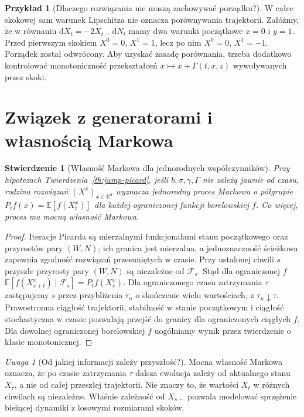 \documentclass[11pt,a4paper,oneside]{report}
\numberwithin{equation}{chapter}
\theoremstyle{plain}
\newtheorem{stwierdzenie}[twierdzenie]{Stwierdzenie}
\theoremstyle{definition}
\newtheorem{przyklad}{Przykład}[chapter]
\theoremstyle{remark}
\newtheorem{uwaga}{Uwaga}[chapter]
\newcommand{\R}{\mathbb{R}}
\newcommand{\E}{\mathbb{E}}
\newcommand{\calF}{\mathcal{F}}
\newcommand{\dd}{\mathrm{d}}
\begin{document}
\begin{przyklad}[Dlaczego rozwiązania nie muszą zachowywać porządku?]
W całce skokowej sam warunek Lipschitza nie oznacza
porównywania trajektorii. Załóżmy, że w równaniu
$\dd X_t=-2X_{t-}\,\dd N_t$ mamy dwa warunki
początkowe $x=0$ i $y=1$. Przed pierwszym skokiem
$X^0=0$, $X^1=1$, lecz po nim $X^0=0$, $X^1=-1$.
Porządek został odwrócony. Aby uzyskać zasadę porównania,
trzeba dodatkowo kontrolować monotoniczność przekształceń
$x\mapsto x+\Gamma(t,x,z)$ wywoływanych przez skoki.
\end{przyklad}

\section{Związek z generatorami i własnością Markowa}\label{sec:volIII:13:07}

\begin{stwierdzenie}[Własność Markowa dla jednorodnych współczynników]\label{prop:volIII:13:01}
\label{prop:jump-markov}
Przy hipotezach Twierdzenia~\ref{th:jump-picard}, jeśli
$b,\sigma,\gamma,\Gamma$ nie zależą jawnie od czasu,
rodzina rozwiązań $(X^x)_{x\in\R^d}$ wyznacza
jednorodny proces Markowa o półgrupie
$P_tf(x)=\E[f(X_t^x)]$ dla każdej ograniczonej funkcji
borelowskiej $f$. Co więcej, proces ma mocną własność Markowa.
\end{stwierdzenie}
\begin{proof}
Iteracje Picarda są mierzalnymi funkcjonałami stanu
początkowego oraz przyrostów pary $(W,N)$; ich granica
jest mierzalna, a jednoznaczność ścieżkowa zapewnia
zgodność rozwiązań przesuniętych w czasie. Przy ustalonej
chwili $s$ przyszłe przyrosty pary $(W,N)$ są niezależne
od $\calF_s$. Stąd dla ograniczonej $f$
$\E[f(X_{s+t}^x)\mid\calF_s]=P_tf(X_s^x)$.
Dla ograniczonego czasu zatrzymania $\tau$ zastępujemy
$s$ przez przybliżenia $\tau_n$ o skończenie wielu
wartościach, z $\tau_n\downarrow\tau$. Prawostronna
ciągłość trajektorii, stabilność w stanie początkowym
i ciągłość stochastyczna w czasie pozwalają przejść
do granicy dla ograniczonych ciągłych $f$.
Dla dowolnej ograniczonej borelowskiej $f$ uogólniamy
wynik przez twierdzenie o klasie monotonicznej.
\end{proof}

\begin{uwaga}[Od jakiej informacji zależy przyszłość?]
Mocna własność Markowa oznacza, że po czasie zatrzymania
$\tau$ dalsza ewolucja zależy od aktualnego stanu
$X_\tau$, a nie od całej przeszłej trajektorii. Nie znaczy
to, że wartości $X_t$ w różnych chwilach są niezależne.
Właśnie zależność od $X_{s-}$ pozwala modelować
sprzężenie bieżącej dynamiki z losowymi rozmiarami skoków.
\end{uwaga}
\end{document}

